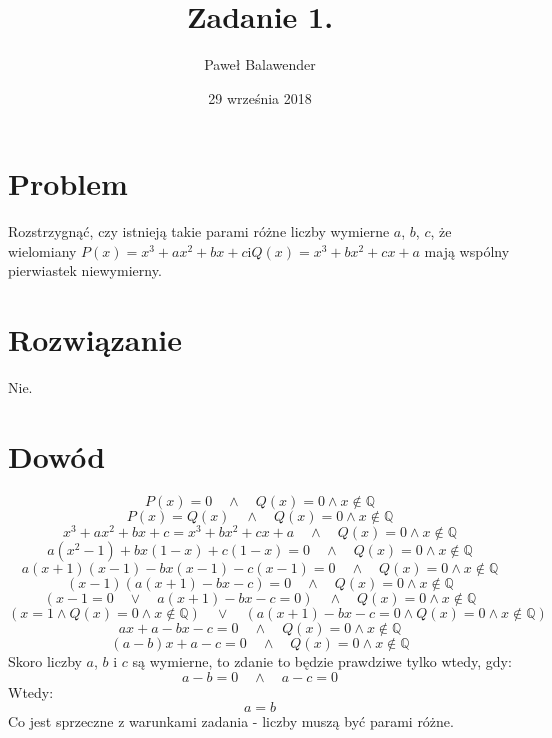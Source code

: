 \documentclass[11pt]{article}
\title{Zadanie 1.}
\date{29 września 2018}
\author{Paweł Balawender}
\begin{document}
\maketitle

\section*{Problem}
\begin{justify}
Rozstrzygnąć, czy istnieją takie parami różne liczby wymierne $a$, $b$, $c$, że wielomiany
$P(x) = x^3 + ax^2 + bx + c$\quad i\quad$Q(x) = x^3 + bx^2 + cx + a$
mają wspólny pierwiastek niewymierny.
\section*{Rozwiązanie}
Nie.
\section*{Dowód}
\begin{equation}P(x) = 0 \quad\land\quad Q(x) = 0 \land x \notin \mathbb{Q}\end{equation}
\begin{equation}P(x) = Q(x) \quad\land\quad Q(x) = 0 \land x \notin \mathbb{Q}\end{equation}
\begin{equation}x^3+ax^2+bx+c = x^3+bx^2+cx+a \quad\land\quad Q(x)=0 \land x \notin\mathbb{Q}\end{equation}
\begin{equation}a(x^2 - 1) + bx(1 - x) + c(1 - x) = 0 \quad\land\quad Q(x) = 0 \land x \notin \mathbb{Q}\end{equation}
\begin{equation}a(x+1)(x-1) - bx(x-1) - c(x-1) = 0 \quad\land\quad Q(x) = 0 \land x \notin \mathbb{Q}\end{equation}
\begin{equation}(x-1)(a(x+1) -bx -c) = 0 \quad\land\quad Q(x) = 0 \land x \notin \mathbb{Q}\end{equation}
\begin{equation}(x-1 = 0 \quad\lor\quad a(x+1)-bx-c = 0) \quad\land\quad Q(x) = 0 \land x \notin \mathbb{Q}\end{equation}
\begin{equation}(x = 1 \land Q(x) = 0 \land x \notin \mathbb{Q})\quad \lor\quad (a(x+1)-bx-c=0 \land Q(x) = 0 \land x \notin \mathbb{Q})\end{equation}
\begin{equation}ax+a-bx-c=0 \quad\land\quad Q(x) = 0 \land x \notin \mathbb{Q}\end{equation}
\begin{equation}(a-b)x + a - c = 0 \quad\land\quad Q(x) = 0 \land x \notin \mathbb{Q}\end{equation}
Skoro liczby $a$, $b$ i $c$ są wymierne, to zdanie to będzie prawdziwe tylko wtedy, gdy:
\begin{equation}a-b=0 \quad\land\quad a-c=0\end{equation}
Wtedy:
\begin{equation}a=b\end{equation}
Co jest sprzeczne z warunkami zadania - liczby muszą być parami różne.
\end{justify}
\end{document}
